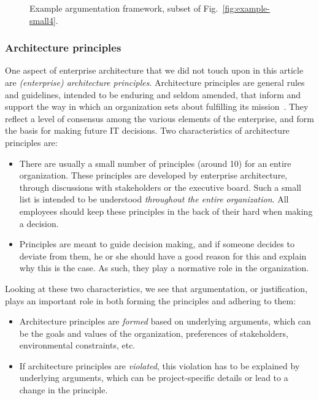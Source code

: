 
\begin{figure}[ht!]
\centering
{}
\caption{Example argumentation framework, subset of Fig.~\ref{fig:example-small4}.}
\label{fig:goalmodeling:arg2}
\end{figure}

\subsubsection*{Architecture principles} 
One aspect of enterprise architecture that we did not touch upon in this article are \emph{(enterprise) architecture principles}. Architecture principles are general rules and guidelines, intended to be enduring and seldom amended, that inform and support the way in which an organization sets about fulfilling its mission~\cite{Lankhorst2005,OptLand2007a,OG2009}. They reflect a level of consensus among the various elements of the enterprise, and form the basis for making future IT decisions. Two characteristics of architecture principles are:
\begin{itemize}
\item There are usually a small number of principles (around 10) for an entire organization. These principles are developed by enterprise architecture, through discussions with stakeholders or the executive board. Such a small list is intended to be understood \emph{throughout the entire organization}. All employees should keep these principles in the back of their hard when making a decision.
\item Principles are meant to guide decision making, and if someone decides to deviate from them, he or she should have a good reason for this and explain why this is the case. As such, they play a normative role in the organization.
\end{itemize}

Looking at these two characteristics, we see that argumentation, or justification, plays an important role in both forming the principles and adhering to them:
\begin{itemize}
\item Architecture principles are \emph{formed} based on underlying arguments, which can be the goals and values of the organization, preferences of stakeholders, environmental constraints, etc.
\item If architecture principles are \emph{violated}, this violation has to be explained by underlying arguments, which can be project-specific details or lead to a change in the principle.
\end{itemize}

